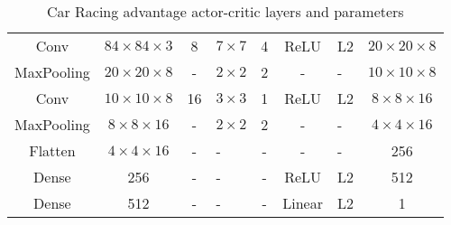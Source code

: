 \begin{table}[H]
{\begin{tabular}{|c|c|c|>{\centering\arraybackslash}p{1cm}|c|c|>{\centering\arraybackslash}p{1.5cm}|c|}
      Conv           & $84\times 84\times 3$ & 8                & $7\times 7$          & 4               & ReLU                & L2                       & $20\times 20\times 8$ \\
      MaxPooling     & $20\times 20\times 8$ & -                & $2\times 2$          & 2               & -                   & -                        & $10\times 10\times 8$ \\
      Conv           & $10\times 10\times 8$ & 16               & $3\times 3$          & 1               & ReLU                & L2                       & $8\times 8\times 16$  \\
      MaxPooling     & $8\times 8\times 16$  & -                & $2\times 2$          & 2               & -                   & -                        & $4\times 4\times 16$  \\
      Flatten        & $4\times 4\times 16$  & -                & -                    & -               & -                   & -                        & 256                   \\
      Dense          & 256                   & -                & -                    & -               & ReLU                & L2                       & 512                   \\
      Dense          & 512                   & -                & -                    & -               & Linear              & L2                       & 1                     \\
      \hline
    \end{tabular}
  }
  \caption[Car Racing A2C network structure]{Car Racing advantage actor-critic layers and parameters}
  \label{table:car_racing_a2c}
\end{table}
